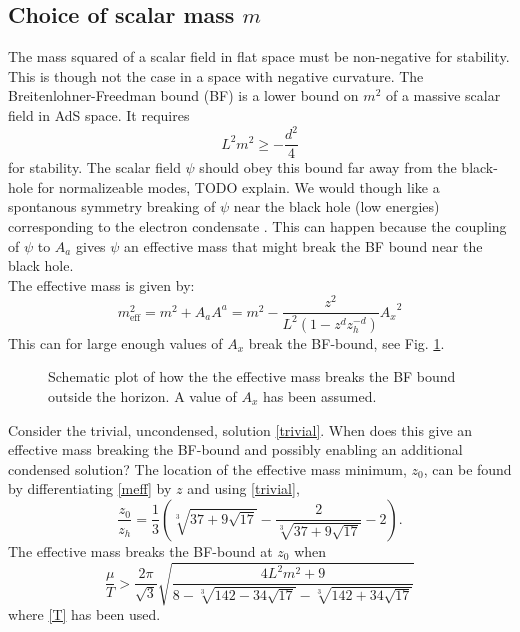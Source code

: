 \documentclass[12pt]{report}
\newcommand{\At}{\ensuremath{{A_x}}}
\begin{document}
\subsection{Choice of scalar mass $m$}
The mass squared of a scalar field in flat space must be non-negative for stability. This is though not the case in a space with negative curvature. The Breitenlohner-Freedman bound (BF) is a lower bound on $m^2$ of a massive scalar field in AdS space. It requires
\begin{equation}
 L^2m^2\geq-\frac{d^2}{4}\label{BF}
\end{equation}
for stability\cite{Kleban:2004bv}. The scalar field $\psi$ should obey this bound far away from the black-hole for normalizeable modes, TODO explain. We would though like a spontanous symmetry breaking of $\psi$ near the black hole (low energies) corresponding to the electron condensate \cite{Gubser:2008px}. This can happen because the coupling of $\psi$ to $A_a$ gives $\psi$ an effective mass that might break the BF bound near the black hole. \\The effective mass is given by:
\begin{equation}
 m_{\mathrm{eff}}^2=m^2+A_aA^a
=m^2-\frac{z^2}{L^2(1-z^dz_h^{-d})}\At^2
\label{meff}
\end{equation}
This can for large enough values of $\At$ break the BF-bound, see Fig. \ref{BF}.
\begin{figure}
\centering

\caption{Schematic plot of how the the effective mass breaks the BF bound outside the horizon. A value of $\At$ has been assumed.\label{BF}}
\end{figure}
Consider the trivial, uncondensed, solution \eqref{trivial}. When does this give an effective mass breaking the BF-bound and possibly enabling an additional condensed solution? The location of the effective mass minimum, $z_0$, can be found by differentiating \eqref{meff} by $z$ and using \eqref{trivial},
\begin{equation}
\frac{z_0}{z_h}=\frac{1}{3} \left(\sqrt[3]{37+9 \sqrt{17}}-\frac{2}{\sqrt[3]{37+9 \sqrt{17}}}-2\right).
\end{equation}
The effective mass breaks the BF-bound at $z_0$ when
\begin{equation}
 \frac{\mu}{T}>
\frac{2\pi }{\sqrt{3}} \sqrt{\frac{4 L^2 m^2+9}{8-\sqrt[3]{142-34
   \sqrt{17}}-\sqrt[3]{142+34 \sqrt{17}}}}
\end{equation}
where \eqref{T} has been used.
\end{document}
